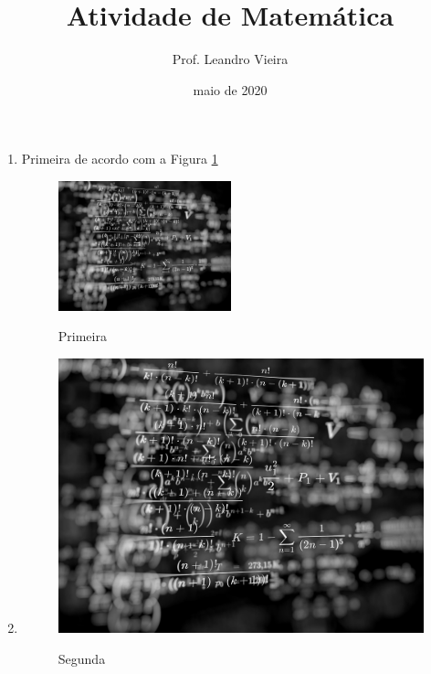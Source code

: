\documentclass[twocolumn]{article}
\title{Atividade de Matemática}
\author{Prof. Leandro Vieira}
\affil{EREM Regina Pacis\\Palmerina-PE}
\date{maio de 2020}
\begin{document}
\maketitle        

\begin{enumerate}
\item Primeira de acordo com a Figura \ref{prim}

\begin{figure}[!htb]
	\centering\includegraphics[width=5cm]{Figuras/imagem}\\
	\caption{Primeira}\label{prim}
\end{figure}

\item 

\begin{figure}[!htb]
	\centering\includegraphics[width=\columnwidth]{Figuras/imagem}\\
	\caption{Segunda}\label{segunda}
\end{figure}

\end{enumerate}
\end{document}
